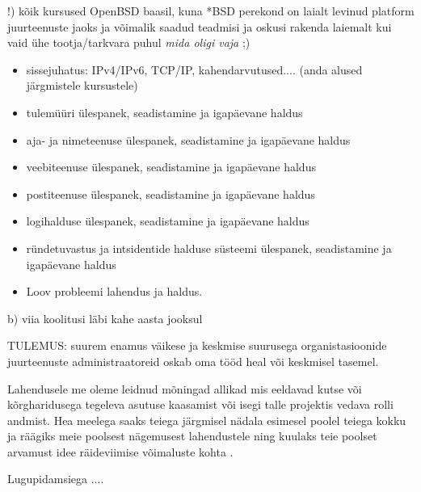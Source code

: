 \begin{spacing}{1}
!) kõik kursused \gls{OpenBSD} baasil, kuna *BSD perekond on laialt levinud platform juurteenuste jaoks ja võimalik saadud teadmisi ja oskusi rakenda laiemalt kui vaid ühe tootja/tarkvara puhul \emph{mida oligi vaja} ;)

\begin{itemize}
	\item[0)] sissejuhatus: IPv4/IPv6, TCP/IP, kahendarvutused.... (anda alused järgmistele kursustele)
	\item[1)] tulemüüri ülespanek, seadistamine ja igapäevane haldus
	\item[2)] aja- ja nimeteenuse ülespanek, seadistamine ja igapäevane haldus
	\item[3)] veebiteenuse ülespanek, seadistamine ja igapäevane haldus
	\item[4)] postiteenuse ülespanek, seadistamine ja igapäevane haldus
	\item[5)] logihalduse ülespanek, seadistamine ja igapäevane haldus
	\item[6)] ründetuvastus ja intsidentide halduse süsteemi ülespanek, seadistamine ja igapäevane haldus
	\item[7)] Loov probleemi lahendus ja haldus.

\end{itemize}


b) viia koolitusi läbi kahe aasta jooksul

TULEMUS:
suurem enamus väikese ja keskmise suurusega organistasioonide juurteenuste administraatoreid oskab oma tööd heal või keskmisel tasemel.


Lahendusele me oleme leidnud mõningad allikad mis eeldavad kutse või kõrgharidusega tegeleva asutuse kaasamist või isegi talle projektis vedava rolli andmist.
Hea meelega saaks teiega järgmisel nädala esimesel poolel teiega kokku ja räägiks meie poolsest nägemusest lahendustele ning kuulaks teie poolset arvamust idee räideviimise võimaluste kohta .

Lugupidamsiega ....
\end{spacing}
\normalfont
